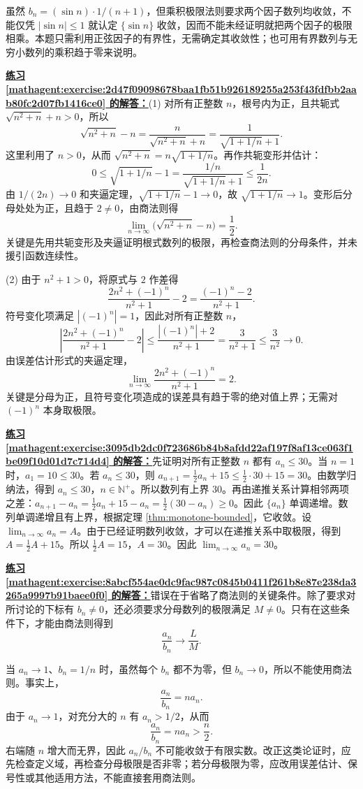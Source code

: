 \documentclass[UTF8,fontset=fandol,11pt]{ctexart}
\begin{document}
虽然 $b_n=(\sin n)\cdot1/(n+1)$，但乘积极限法则要求两个因子数列均收敛，不能仅凭 $|\sin n|\leq1$ 就认定 $\{\sin n\}$ 收敛，因而不能未经证明就把两个因子的极限相乘。本题只需利用正弦因子的有界性，无需确定其收敛性；也可用有界数列与无穷小数列的乘积趋于零来说明。\par
\par\noindent\textbf{\hyperref[mathagent:exercise:2d47f09098678baa1fb51b926189255a253f43fdfbb2aab80fc2d07fb1416ce0]{练习 \ref*{mathagent:exercise:2d47f09098678baa1fb51b926189255a253f43fdfbb2aab80fc2d07fb1416ce0} 的解答：}}(1) 对所有正整数 $n$，根号内为正，且共轭式 $\sqrt{n^2+n}+n>0$，所以
\[
\sqrt{n^2+n}-n
=\frac{n}{\sqrt{n^2+n}+n}
=\frac1{\sqrt{1+1/n}+1}.
\]
这里利用了 $n>0$，从而 $\sqrt{n^2+n}=n\sqrt{1+1/n}$。再作共轭变形并估计：
\[
0\leq\sqrt{1+1/n}-1
=\frac{1/n}{\sqrt{1+1/n}+1}
\leq\frac1{2n}.
\]
由 $1/(2n)\to0$ 和夹逼定理，$\sqrt{1+1/n}-1\to0$，故 $\sqrt{1+1/n}\to1$。变形后分母处处为正，且趋于 $2\neq0$，由商法则得
\[
\lim_{n\to\infty}\bigl(\sqrt{n^2+n}-n\bigr)=\frac12.
\]
关键是先用共轭变形及夹逼证明根式数列的极限，再检查商法则的分母条件，并未援引函数连续性。

(2) 由于 $n^2+1>0$，将原式与 $2$ 作差得
\[
\frac{2n^2+(-1)^n}{n^2+1}-2
=\frac{(-1)^n-2}{n^2+1}.
\]
符号变化项满足 $|(-1)^n|=1$，因此对所有正整数 $n$，
\[
\left|\frac{2n^2+(-1)^n}{n^2+1}-2\right|
\leq\frac{|(-1)^n|+2}{n^2+1}
=\frac3{n^2+1}\leq\frac3{n^2}\to0.
\]
由误差估计形式的夹逼定理，
\[
\lim_{n\to\infty}\frac{2n^2+(-1)^n}{n^2+1}=2.
\]
关键是分母为正，且符号变化项造成的误差具有趋于零的绝对值上界；无需对 $(-1)^n$ 本身取极限。\par
\par\noindent\textbf{\hyperref[mathagent:exercise:3095db2dc0f723686b84b8afdd22af197f8af13ce063f1be09f10d01d7c714d4]{练习 \ref*{mathagent:exercise:3095db2dc0f723686b84b8afdd22af197f8af13ce063f1be09f10d01d7c714d4} 的解答：}}先证明对所有正整数 $n$ 都有 $a_n\leq30$。当 $n=1$ 时，$a_1=10\leq30$。若 $a_n\leq30$，则 $a_{n+1}=\frac12a_n+15\leq\frac12\cdot30+15=30$。由数学归纳法，得到 $a_n\leq30$，$n\in\mathbb{N}^{+}$。所以数列有上界 $30$。再由递推关系计算相邻两项之差：$a_{n+1}-a_n=\frac12a_n+15-a_n=\frac12(30-a_n)\geq0$。因此 $\{a_n\}$ 单调递增。数列单调递增且有上界，根据定理 \ref{thm:monotone-bounded}，它收敛。设 $\lim_{n\to\infty}a_n=A$。由于已经证明数列收敛，才可以在递推关系中取极限，得到 $A=\frac12A+15$。所以 $\frac12A=15$，$A=30$。因此 $\lim_{n\to\infty}a_n=30$。\par
\par\noindent\textbf{\hyperref[mathagent:exercise:8abcf554ae0dc9fac987c0845b0411f261b8e87e238da3265a9997b91baee0f0]{练习 \ref*{mathagent:exercise:8abcf554ae0dc9fac987c0845b0411f261b8e87e238da3265a9997b91baee0f0} 的解答：}}错误在于省略了商法则的关键条件。除了要求对所讨论的下标有 $b_n\neq0$，还必须要求分母数列的极限满足 $M\neq0$。只有在这些条件下，才能由商法则得到
\[
\frac{a_n}{b_n}\to\frac{L}{M}.
\]

当 $a_n\to1$、$b_n=1/n$ 时，虽然每个 $b_n$ 都不为零，但 $b_n\to0$，所以不能使用商法则。事实上，
\[
\frac{a_n}{b_n}=n a_n.
\]
由于 $a_n\to1$，对充分大的 $n$ 有 $a_n>1/2$，从而
\[
\frac{a_n}{b_n}=n a_n>\frac n2.
\]
右端随 $n$ 增大而无界，因此 $a_n/b_n$ 不可能收敛于有限实数。改正这类论证时，应先检查定义域，再检查分母极限是否非零；若分母极限为零，应改用误差估计、保号性或其他适用方法，不能直接套用商法则。\par
\end{document}

